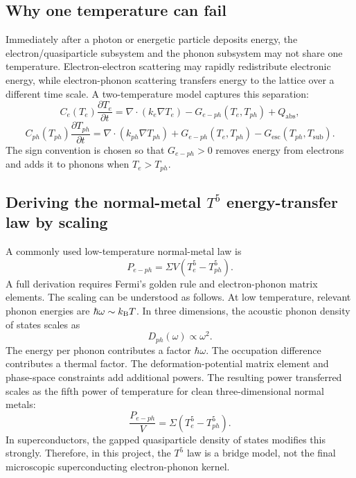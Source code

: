 \documentclass[11pt]{article}
\newcommand{\esc}{\mathrm{esc}}
\newcommand{\sub}{\mathrm{sub}}
\begin{document}
\subsection{Why one temperature can fail}
Immediately after a photon or energetic particle deposits energy, the electron/quasiparticle subsystem and the phonon subsystem may not share one temperature. Electron-electron scattering may rapidly redistribute electronic energy, while electron-phonon scattering transfers energy to the lattice over a different time scale. A two-temperature model captures this separation:
\begin{equation}
C_e(T_e)\frac{\partial T_e}{\partial t}=\nabla\cdot(k_e\nabla T_e)-G_{e-ph}(T_e,T_{ph})+Q_{\mathrm{abs}},
\end{equation}
\begin{equation}
C_{ph}(T_{ph})\frac{\partial T_{ph}}{\partial t}=\nabla\cdot(k_{ph}\nabla T_{ph})+G_{e-ph}(T_e,T_{ph})-G_{\esc}(T_{ph},T_{\sub}).
\end{equation}
The sign convention is chosen so that $G_{e-ph}>0$ removes energy from electrons and adds it to phonons when $T_e>T_{ph}$.

\subsection{Deriving the normal-metal $T^5$ energy-transfer law by scaling}
A commonly used low-temperature normal-metal law is
\begin{equation}
P_{e-ph}=\Sigma V(T_e^5-T_{ph}^5).
\end{equation}
A full derivation requires Fermi's golden rule and electron-phonon matrix elements. The scaling can be understood as follows. At low temperature, relevant phonon energies are $\hbar\omega\sim k_{\mathrm{B}} T$. In three dimensions, the acoustic phonon density of states scales as
\begin{equation}
D_{ph}(\omega)\propto\omega^2.
\end{equation}
The energy per phonon contributes a factor $\hbar\omega$. The occupation difference contributes a thermal factor. The deformation-potential matrix element and phase-space constraints add additional powers. The resulting power transferred scales as the fifth power of temperature for clean three-dimensional normal metals:
\begin{equation}
\frac{P_{e-ph}}{V}=\Sigma(T_e^5-T_{ph}^5).
\end{equation}
In superconductors, the gapped quasiparticle density of states modifies this strongly. Therefore, in this project, the $T^5$ law is a bridge model, not the final microscopic superconducting electron-phonon kernel.
\end{document}
